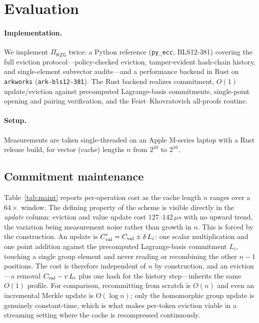 \section{Evaluation}\label{sec:eval}

\paragraph{Implementation.}
We implement $\Pi_{\mathsf{KZG}}$ twice: a Python reference (\texttt{py\_ecc},
BLS12-381) covering the full eviction protocol---policy-checked eviction,
tamper-evident hash-chain history, and single-element subvector audits---and a
performance backend in Rust on \texttt{arkworks} (\texttt{ark-bls12-381}). The
Rust backend realizes commitment, $O(1)$ update/eviction against precomputed
Lagrange-basis commitments, single-point opening and pairing verification, and
the Feist--Khovratovich all-proofs routine.

\paragraph{Setup.}
Measurements are taken single-threaded on an Apple M-series laptop with a Rust
release build, for vector (cache) lengths $n$ from $2^{10}$ to $2^{16}$.

\subsection{Commitment maintenance}
Table~\ref{tab:maint} reports per-operation cost as the cache length $n$ ranges
over a $64\times$ window. The defining property of the scheme is visible directly
in the \emph{update} column: eviction and value update cost $127$--$142\,\mu s$
with no upward trend, the variation being measurement noise rather than growth in
$n$. This is forced by the construction. An update is
$C_{\mathrm{val}}'=C_{\mathrm{val}}\pm\delta\,L_i$: one scalar multiplication and one point addition
against the precomputed Lagrange-basis commitment $L_i$, touching a single group
element and never reading or recombining the other $n-1$ positions. The cost is
therefore independent of $n$ by construction, and an eviction---a removal
$C_{\mathrm{val}}-v\,L_i$ plus one hash for the history step---inherits the same $O(1)$
profile. For comparison, recommitting from scratch is $O(n)$ and even an
incremental Merkle update is $O(\log n)$; only the homomorphic group update is
genuinely constant-time, which is what makes per-token eviction viable in a
streaming setting where the cache is recompressed continuously.

